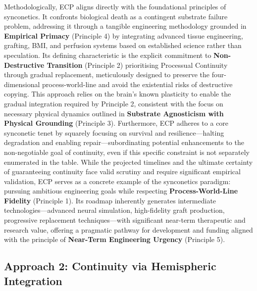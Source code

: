 \documentclass[10pt]{article}
\begin{document}
\begin{sloppypar}
  Methodologically, ECP aligns directly with the foundational principles of synconetics. It confronts biological death as a contingent substrate failure problem, addressing it through a tangible engineering methodology grounded in \textbf{Empirical Primacy} (Principle 4) by integrating advanced tissue engineering, grafting, BMI, and perfusion systems based on established science rather than speculation. Its defining characteristic is the explicit commitment to \textbf{Non-Destructive Transition} (Principle 2) prioritising Processual Continuity through gradual replacement, meticulously designed to preserve the four-dimensional process-world-line and avoid the existential risks of destructive copying. This approach relies on the brain’s known plasticity to enable the gradual integration required by Principle 2, consistent with the focus on necessary physical dynamics outlined in \textbf{Substrate Agnosticism with Physical Grounding} (Principle 3). Furthermore, ECP adheres to a core synconetic tenet by squarely focusing on survival and resilience—halting degradation and enabling repair—subordinating potential enhancements to the non-negotiable goal of continuity, even if this specific constraint is not separately enumerated in the table. While the projected timelines and the ultimate certainty of guaranteeing continuity face valid scrutiny and require significant empirical validation, ECP serves as a concrete example of the synconetics paradigm: pursuing ambitious engineering goals while respecting \textbf{Process-World-Line Fidelity} (Principle 1). Its roadmap inherently generates intermediate technologies—advanced neural simulation, high-fidelity graft production, progressive replacement techniques—with significant near-term therapeutic and research value, offering a pragmatic pathway for development and funding aligned with the principle of \textbf{Near-Term Engineering Urgency} (Principle 5).

  \subsection{Approach 2: Continuity via Hemispheric Integration}
  \label{sec:chi}


\end{sloppypar}
\end{document}
